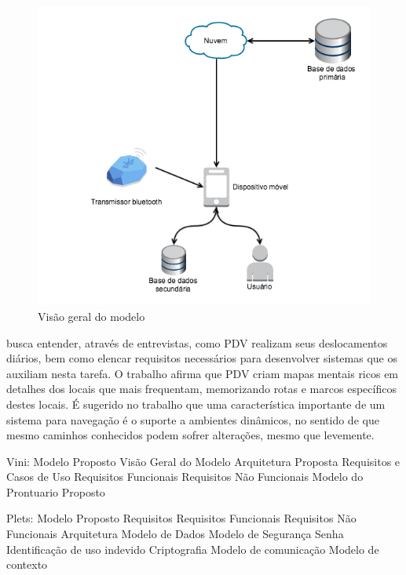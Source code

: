 \documentclass[english,brazilian]{UNISINOSmonografia}
\begin{document}
\FloatBarrier
\begin{figure}
	\caption{Visão geral do modelo}
	\label{fig:visaoGeral}
	\centering%
	\begin{minipage}{.8\textwidth}
		\includegraphics[width=\textwidth]{imgs/visaoGeral}
	\end{minipage}
\end{figure}
\FloatBarrier



 busca entender, através de entrevistas, como PDV realizam seus deslocamentos diários, bem como elencar requisitos necessários para desenvolver sistemas que os auxiliam nesta tarefa. O trabalho afirma que PDV criam mapas mentais ricos em detalhes dos locais que mais frequentam, memorizando rotas e marcos específicos destes locais. É sugerido no trabalho que uma característica importante de um sistema para navegação é o suporte a ambientes dinâmicos, no sentido de que mesmo caminhos conhecidos podem sofrer alterações, mesmo que levemente.




Vini:
Modelo Proposto
	Visão Geral do Modelo
	Arquitetura Proposta
	Requisitos e Casos de Uso
		Requisitos Funcionais
		Requisitos Não Funcionais
	Modelo do Prontuario Proposto


Plets:
Modelo Proposto
	Requisitos
		Requisitos Funcionais
		Requisitos Não Funcionais
	Arquitetura
	Modelo de Dados
	Modelo de Segurança
		Senha
		Identificação de uso indevido
		Criptografia
	Modelo de comunicação
	Modelo de contexto
\end{document}

